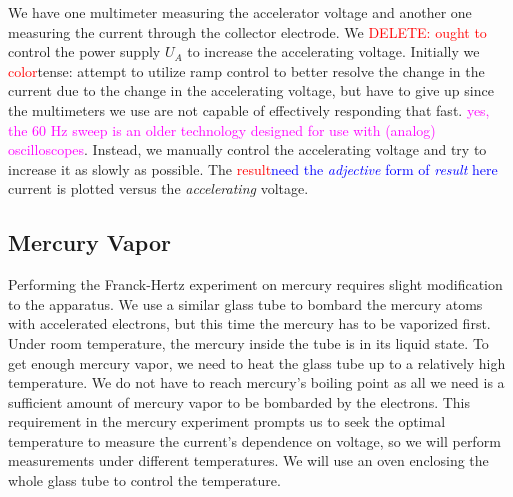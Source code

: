 \documentclass[prb,preprint]{revtex4-1}
\begin{document}
We have one multimeter measuring the accelerator voltage and another one measuring the current through the collector electrode. We \textcolor{red}{DELETE: ought to} control the power supply $U_{A}$ to increase the accelerating voltage. Initially we \textcolor{red}{color}{tense: attempt} to utilize ramp control to better resolve the change in the current due to the change in the accelerating voltage, but have to give up since the multimeters we use are not capable of effectively responding that fast. \textcolor{magenta}{yes, the 60 Hz sweep is an older technology designed for use with (analog) oscilloscopes}. Instead, we manually control the accelerating voltage and try to increase it as slowly as possible. The \textcolor{red}{result}\textcolor{blue}{need the \textit{adjective} form of \textit{result} here} current is plotted versus the \textit{accelerating} voltage.

\subsection{Mercury Vapor}

Performing the Franck-Hertz experiment on mercury requires slight modification to the apparatus. We use a similar glass tube to bombard the mercury atoms with accelerated electrons, but this time the mercury has to be vaporized first. Under room temperature, the mercury inside the tube is in its liquid state. To get enough mercury vapor, we need to heat the glass tube up to a relatively high temperature. We do not have to reach mercury's boiling point as all we need is a sufficient amount of mercury vapor to be bombarded by the electrons. This requirement in the mercury experiment prompts us to seek the optimal temperature to measure the current's dependence on voltage, so we will perform measurements under different temperatures. We will use an oven enclosing the whole glass tube to control the temperature.
\end{document}
